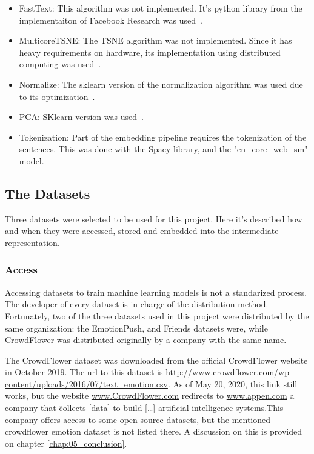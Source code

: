 \begin{itemize}
  \item FastText: This algorithm was not implemented. It's python library from the implementaiton of Facebook Research was used~\cite{joulin2017fasttext}.
  \item MulticoreTSNE: The TSNE algorithm was not implemented. Since it has heavy requirements on hardware, its implementation using distributed computing was used~\cite{ulyanov2016tsne}.
  \item Normalize: The sklearn version of the normalization algorithm was used due to its optimization~\cite{sklearn}.
  \item PCA: SKlearn version was used~\cite{sklearn}.
  \item Tokenization: Part of the embedding pipeline requires the tokenization of the sentences. This was done with the Spacy library, and the "en_core_web_sm" model.\cite{spacy}
\end{itemize}

\subsection{The Datasets}\label{sub:The Datasets}
Three datasets were selected to be used for this project. Here it's described how and when they were accessed, stored and embedded into the intermediate representation.

\subsubsection{Access}\label{subs:Access}
Accessing datasets to train machine learning models is not a standarized process. The developer of every dataset is in charge of the distribution method. Fortunately, two of the three datasets used in this project were distributed by the same organization: the EmotionPush, and Friends datasets were, while CrowdFlower was distributed originally by a company with the same name.

The CrowdFlower dataset was downloaded from the official CrowdFlower website in October 2019. The url to this dataset is \url{http://www.crowdflower.com/wp-content/uploads/2016/07/text_emotion.csv}. As of May 20, 2020, this link still works, but the website \url{www.CrowdFlower.com} redirects to \url{www.appen.com} a company that \"collects [data] to build [\ldots] artificial intelligence systems.\" This company offers access to some open source datasets, but the mentioned crowdflower emotion dataset is not listed there. A discussion on this is provided on chapter \ref{chap:05_conclusion}.


